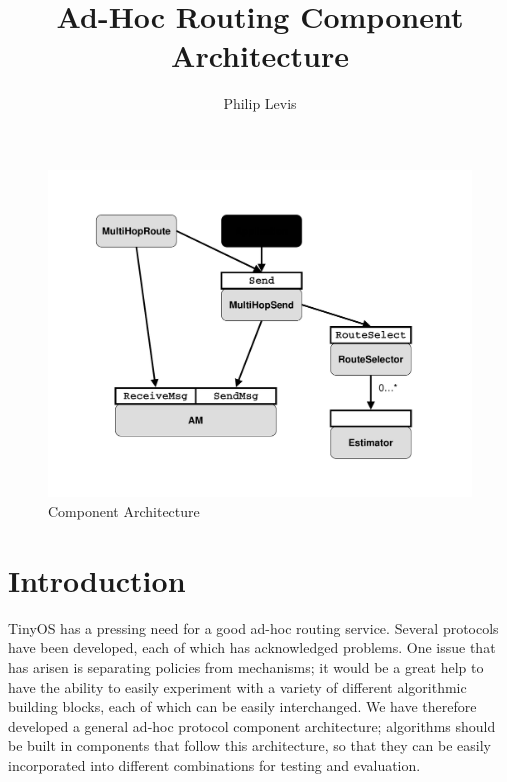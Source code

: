 \documentclass[10pt]{article}
\begin{document}
\fontsize{10}{10}                               %

\title{Ad-Hoc Routing Component Architecture}
\author{Philip Levis}
\maketitle

\fontsize{10}{10}                               %


\begin{figure}
\centering
\includegraphics[angle=-90,scale=.25]{fig/arch.pdf}
\caption{Component Architecture}
\label{fig:arch}
\end{figure}


\section*{Introduction}

TinyOS has a pressing need for a good ad-hoc routing service. Several
protocols have been developed, each of which has acknowledged
problems. One issue that has arisen is separating policies from
mechanisms; it would be a great help to have the ability to easily
experiment with a variety of different algorithmic building blocks,
each of which can be easily interchanged. We have therefore developed
a general ad-hoc protocol component architecture; algorithms should be
built in components that follow this architecture, so that they can be
easily incorporated into different combinations for testing and
evaluation.
\end{document}
